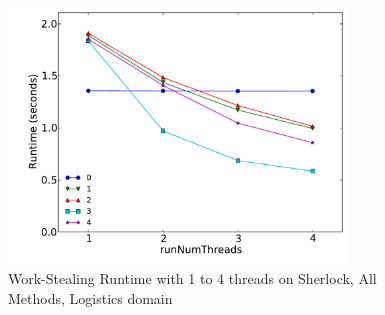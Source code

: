 \begin{figure}[!htbp]
\begin{centering}
\includegraphics[width=0.8\textwidth]{images/threads-log3-sherlock-all-1}
\par\end{centering}
\caption{Work-Stealing Runtime with 1 to 4 threads on Sherlock, All Methods, Logistics domain}
\end{figure}